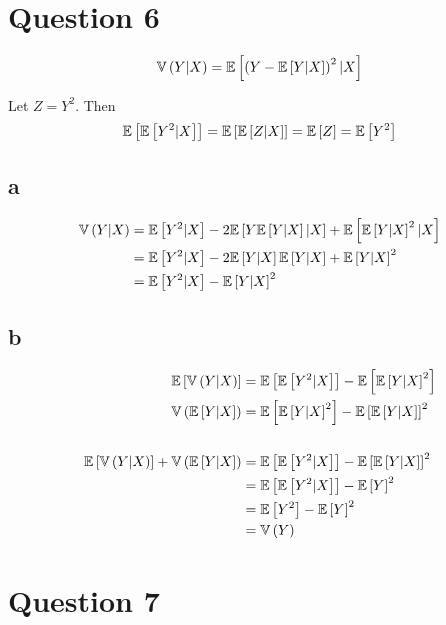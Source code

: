 \documentclass[12pt]{paper}
\begin{document}
\section*{Question 6}

\begin{equation*}
  \Vari{ Y \vert X} = \exV{ \left( Y - \exV{Y \vert X} \right)^2 \vert X}
\end{equation*}

Let $Z = Y^2$. Then
\begin{equation*}
\exV{\exV{Y^2 \vert X}} = \exV{\exV{Z \vert X}}= \exV{Z} = \exV{Y^2}  
\end{equation*}

\subsection*{a}

\begin{align*}
  \Vari{ Y \vert X} &= \exV{ Y^2 \vert X } - 2  \exV{ Y \exV{ Y \vert X} \vert X} +
                  \exV{\exV{Y \vert X}^2\vert X}\\
                &= \exV{ Y^2 \vert X} - 2 \exV{ Y \vert X} \exV{ Y \vert X} + \exV{Y \vert X}^2\\
  &= \exV{Y^2 \vert X} - \exV{Y \vert X}^2
\end{align*}

\subsection*{b}

\begin{align*}
  \exV{\Vari{Y\vert X}} &= \exV{ \exV{ Y^2 | X}} - \exV{\exV{ Y \vert X}^2}\\
  \Vari{\exV{Y\vert X}} &= \exV{\exV{Y \vert X}^2} - \exV{\exV{Y\vert X}}^2\\
  \\
  \exV{\Vari{Y\vert X}} + \Vari{\exV{Y\vert X}} &= \exV{ \exV{Y^2 \vert X}} -
                                       \exV{\exV{Y\vert X}}^2\\
                   &= \exV{\exV{Y^2 \vert X}} - \exV{Y}^2\\
                   &=\exV{Y^2} - \exV{Y}^2\\
                   &= \Vari{Y}
\end{align*}

\section*{Question 7}
\end{document}
